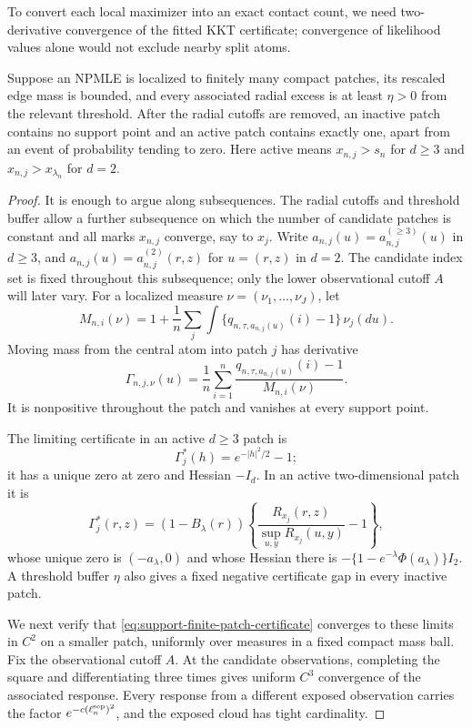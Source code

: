To convert each local maximizer into an exact contact count, we need
two-derivative convergence of the fitted KKT certificate; convergence of
likelihood values alone would not exclude nearby split atoms.
\begin{proposition}
\label{prop:support-one-contact-per-patch}
Suppose an NPMLE is localized to finitely many compact patches,
its rescaled edge mass is bounded, and every associated radial excess is at
least \(\eta>0\) from the relevant threshold. After the radial cutoffs are
removed, an inactive patch contains no support point and an active patch
contains exactly one, apart from an event of probability tending to zero.
Here active means \(x_{n,j}>s_n\) for \(d\ge3\) and
\(x_{n,j}>x_{\lambda_n}\) for \(d=2\).
\end{proposition}

\begin{proof}
It is enough to argue along subsequences. The radial cutoffs and threshold
buffer allow a further subsequence on which the number of candidate patches is
constant and all marks \(x_{n,j}\) converge, say to \(x_j\). Write
\(a_{n,j}(u)=a_{n,j}^{(\ge3)}(u)\) in \(d\ge3\), and
\(a_{n,j}(u)=a_{n,j}^{(2)}(r,z)\) for \(u=(r,z)\) in \(d=2\).
The candidate index set is fixed throughout this subsequence; only the lower
observational cutoff \(A\) will later vary.  For a localized measure
\(\nu=(\nu_1,\ldots,\nu_J)\), let
\[
 M_{n,i}(\nu)=1+\frac1n\sum_j
   \int\{q_{n,\tau,a_{n,j}(u)}(i)-1\}\,\nu_j(du).
\]
Moving mass from the central atom into patch \(j\) has derivative
\begin{equation}
\label{eq:support-finite-patch-certificate}
 \Gamma_{n,j,\nu}(u)
 =\frac1n\sum_{i=1}^n
   \frac{q_{n,\tau,a_{n,j}(u)}(i)-1}{M_{n,i}(\nu)}.
\end{equation}
It is nonpositive throughout the patch and vanishes at every support point.

The limiting certificate in an active \(d\ge3\) patch is
\[
    \Gamma_j^*(h)=e^{-|h|^2/2}-1;
\]
it has a unique zero at zero and Hessian \(-I_d\). In an active
two-dimensional patch it is
\[
 \Gamma_j^*(r,z)
 =(1-B_\lambda(r))
 \left\{\frac{R_{x_j}(r,z)}{\sup_{u,y}R_{x_j}(u,y)}-1\right\},
\]
whose unique zero is \((-a_\lambda,0)\) and whose Hessian there is
\(-\{1-e^{-\lambda}\Phi(a_\lambda)\}I_2\). A threshold buffer \(\eta\)
also gives a fixed negative certificate gap in every inactive patch.

We next verify that \eqref{eq:support-finite-patch-certificate} converges to
these limits in \(C^2\) on a smaller patch, uniformly over measures in a fixed
compact mass ball.  Fix the observational cutoff \(A\).  At the candidate
observations, completing the square and differentiating three times gives
uniform \(C^3\) convergence of the associated response.  Every response from
a different exposed observation carries the factor
\(e^{-c(\ell_n^{\rm sep})^2}\), and the exposed cloud has tight cardinality.


\end{proof}
